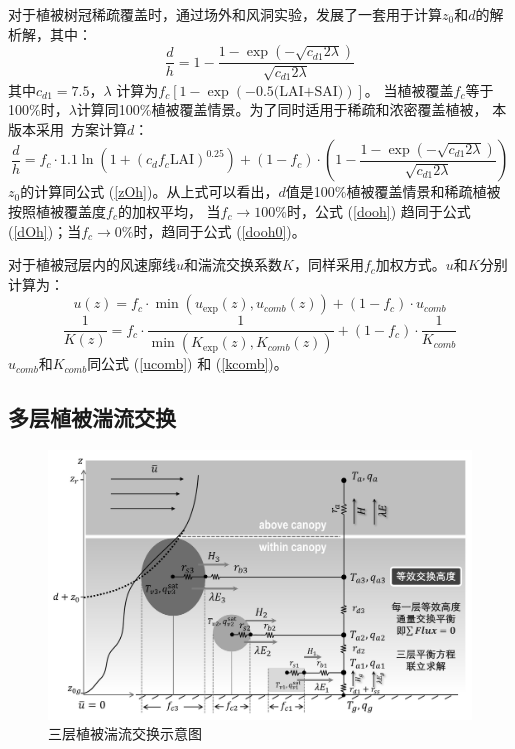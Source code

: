 对于植被树冠稀疏覆盖时，\citet{raupach1992drag,raupach1994simplified}通过场外和风洞实验，发展了一套用于计算$z_0$和$d$的解析解，其中：
\begin{equation}\label{dooh0}
\frac{d}{h}=1-\frac{1-\exp \left(-\sqrt{c_{d1} 2 \lambda}\right)}{\sqrt{c_{d1} 2 \lambda}}
\end{equation}
其中$c_{d1}=7.5$，$\lambda$%
计算为$f_c\left[1-\exp{\left(-0.5\text{(LAI+SAI)}\right)}\right]$。
当植被覆盖$f_c$等于100\%时，$\lambda$计算同100\%植被覆盖情景。为了同时适用于稀疏和浓密覆盖植被，
本版本采用~\citet{dai2019different}方案计算$d$：
\begin{equation}\label{dooh}
\frac{d}{h}=f_{c} \cdot 1.1 \ln \left(1+\left(c_{d} f_{c} \text{LAI}\right)^{0.25}\right)+\left(1-f_{c}\right) \cdot\left(1-\frac{1-\exp \left(-\sqrt{c_{d1} 2 \lambda}\right)}{\sqrt{c_{d1} 2 \lambda}}\right)
\end{equation}
$z_0$的计算同公式 (\ref{zOh})。从上式可以看出，$d$值是100\%植被覆盖情景和稀疏植被按照植被覆盖度$f_c$的加权平均，
当$f_c\rightarrow100\%$时，公式 (\ref{dooh}) 趋同于公式 (\ref{dOh})；当$f_c\rightarrow0\%$时，趋同于公式 (\ref{dooh0})。


对于植被冠层内的风速廓线$u$和湍流交换系数$K$，同样采用$f_c$加权方式。$u$和$K$分别计算为：
\begin{equation}
u(z)=f_{c} \cdot \min \left(u_{\exp }(z), u_{comb}(z)\right)+\left(1-f_{c}\right) \cdot u_{comb}
\end{equation}
\begin{equation}
\frac{1}{K(z)}=f_{c} \cdot \frac{1}{\min \left(K_{\exp}(z), K_{comb}(z)\right)}+\left(1-f_{c}\right) \cdot \frac{1}{K_{comb}}
\end{equation}
$u_{comb}$和$K_{comb}$同公式 (\ref{ucomb}) 和 (\ref{kcomb})。


\subsection{多层植被湍流交换}
{
\begin{figure}[htbp]
\centering
\includegraphics[width=1\linewidth]{Figures/地表湍流交换过程/三层植被湍流交换示意图_v2.jpg}
\caption{三层植被湍流交换示意图}
\label{fig:三层植被湍流交换示意图}
\end{figure}
}

